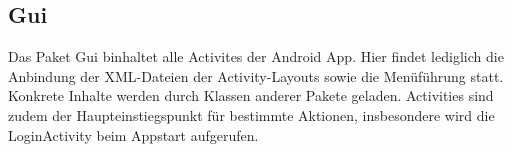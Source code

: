 \label{app:module:gui}\subsection{Gui}
Das Paket Gui binhaltet alle Activites der Android App. Hier findet lediglich die Anbindung der XML-Dateien der Activity-Layouts sowie die Menüführung statt. Konkrete Inhalte werden durch Klassen anderer Pakete geladen. Activities sind zudem der Haupteinstiegspunkt für bestimmte Aktionen, insbesondere wird die LoginActivity beim Appstart aufgerufen.